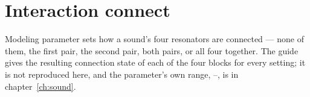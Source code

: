 \section{Interaction connect}
Modeling parameter  sets how a sound's four resonators are connected --- none of
them, the first pair, the second pair, both pairs, or all four together. The guide gives
the resulting connection state of each of the four blocks for every setting; it is not
reproduced here, and the parameter's own range, --, is in
chapter~\ref{ch:sound}.
